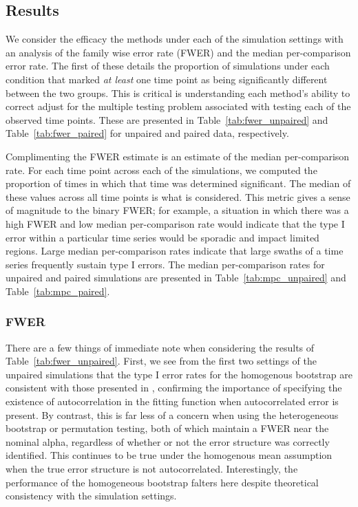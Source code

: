 \subsection{Results}

We consider the efficacy the methods under each of the simulation settings with an analysis of the family wise error rate (FWER) and the median per-comparison error rate. The first of these details the proportion of simulations under each condition that marked \textit{at least} one time point as being significantly different between the two groups. This is critical is understanding each method's ability to correct adjust for the multiple testing problem associated with testing each of the observed time points. These are presented in Table~\ref{tab:fwer_unpaired} and Table~\ref{tab:fwer_paired} for unpaired and paired data, respectively.

Complimenting the FWER estimate is an estimate of the median per-comparison rate. For each time point across each of the simulations, we computed the proportion of times in which that time was determined significant. The median of these values across all time points is what is considered. This metric gives a sense of magnitude to the binary FWER; for example, a situation in which there was a high FWER and low median per-comparison rate would indicate that the type I error within a particular time series would be sporadic and impact limited regions. Large median per-comparison rates indicate that large swaths of a time series frequently sustain type I errors. The median per-comparison rates for unpaired and paired simulations are presented in Table~\ref{tab:mpc_unpaired} and Table~\ref{tab:mpc_paired}.


\subsubsection{FWER}



There are a few things of immediate note when considering the results of Table~\ref{tab:fwer_unpaired}. First, we see from the first two settings of the unpaired simulations that the type I error rates for the homogenous bootstrap are consistent with those presented in \cite{oleson2017detecting}, confirming the importance of specifying the existence of autocorrelation in the  fitting function when autocorrelated error is present. By contrast, this is far less of a concern when using the heterogeneous bootstrap or permutation testing, both of which maintain a FWER near the nominal alpha, regardless of whether or not the error structure was correctly identified. This continues to be true under the homogenous mean assumption when the true error structure is not autocorrelated. Interestingly, the performance of the homogeneous bootstrap falters here despite theoretical consistency with the simulation settings. 


